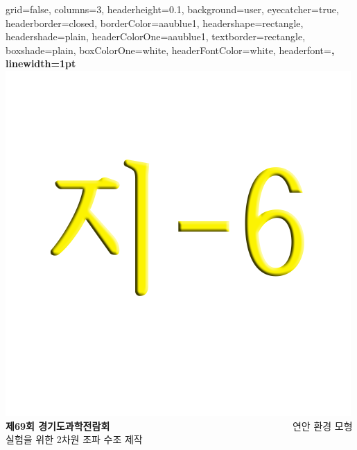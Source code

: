\documentclass[a0paper,portrait]{Junlam_PosterP}
\begin{document}
\begin{poster}{
  grid=false,
  columns=3,
  headerheight=0.1\textheight,
  background=user,
  eyecatcher=true,
  headerborder=closed,
  borderColor=aaublue1,
  headershape=rectangle,
  headershade=plain,
  headerColorOne=aaublue1,
  textborder=rectangle,
  boxshade=plain,
  boxColorOne=white,
  headerFontColor=white,
  headerfont=\Large\sf\bf,
  linewidth=1pt
}
{
  \includegraphics[height=0.75\headerheight]{images/gshslogo1.png}
}
{\color{white}\bf \Large
제69회 경기도과학전람회 $~~~~~~~~~~~~~~~~~~~~~~~~~~~~~~~~~~~~~~~~~~~~~~~~~~~~~~~~~~~~~~~~~~~~~~~~~~~~~~~~~~$      
}
{\color{white}\LARGE
  \vspace{1em} 연안 환경 모형 실험을 위한 2차원 조파 수조 제작 }
{
}


\end{poster}
\end{document}
